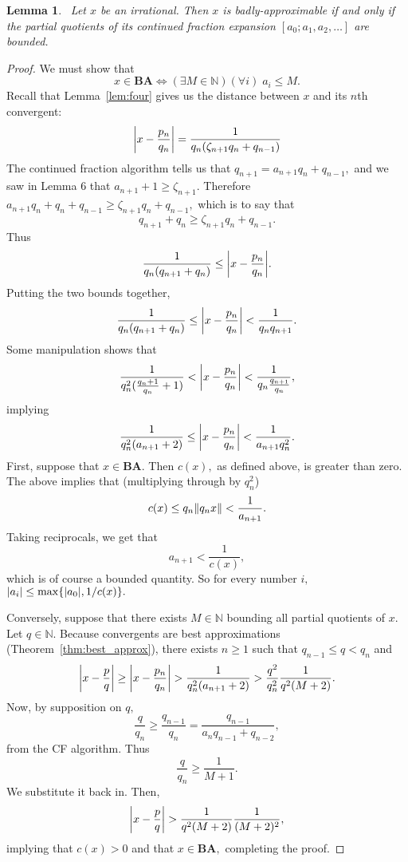 \documentclass[12pt, letterpaper, oneside]{book}
\newcommand{\gz}{\ensuremath{\zeta}}
\newcommand{\N}{\mathbb{N}}
\DeclarePairedDelimiter{\abs}{\lvert}{\rvert}
\DeclarePairedDelimiter{\norm}{\lVert}{\rVert}
\DeclarePairedDelimiter{\set}{\lbrace}{\rbrace}
\theoremstyle{plain}
\newtheorem{lemma}[theorem]{Lemma}
\theoremstyle{definition}
\theoremstyle{remark}
\begin{document}
\begin{lemma}~\label{lem: boundedcf}
Let $x$ be an irrational. Then $x$ is badly-approximable if and only if the partial quotients of its continued fraction expansion $[a_0; a_1, a_2, \ldots]$ are bounded.
\end{lemma}
\begin{proof}
We must show that
\[
x \in \mathbf{BA} \iff (\exists M \in \N) (\forall i) \; a_i \leq M.
\]
Recall that Lemma~\ref{lem:four} gives us the distance between $x$ and its $n$th convergent:
\[
\abs*{x - \frac{p_n}{q_n}} = \frac{1}{q_n(\gz_{n+1}q_n + q_{n-1})}
\]
The continued fraction algorithm tells us that $q_{n+1} = a_{n+1}q_n + q_{n-1},$ and we saw in Lemma 6 that $a_{n+1} + 1 \geq \gz_{n+1}.$ Therefore $a_{n+1}q_n + q_n + q_{n-1} \geq \gz_{n+1}q_n + q_{n-1},$ which is to say that
\[
q_{n+1} + q_n \geq \gz_{n+1}q_n + q_{n-1}.
\]
Thus
\[
\frac{1}{q_n(q_{n+1} + q_n)} \leq \abs*{x - \frac{p_n}{q_n}}. 
\]
Putting the two bounds together, 
\[
\frac{1}{q_n(q_{n+1} + q_n)} \leq \abs*{x - \frac{p_n}{q_n}} < \frac{1}{q_nq_{n+1}}.
\]
Some manipulation shows that
\[
\frac{1}{q_n^2(\frac{q_n+1}{q_n}+1)} < \abs*{x - \frac{p_n}{q_n}} < \frac{1}{q_n\frac{q_{n+1}}{q_n}},
\]
implying
\[
\frac{1}{q_n^2(a_{n+1} + 2)} \leq \abs*{x - \frac{p_n}{q_n}} < \frac{1}{a_{n+1}q_n^2}.
\]
First, suppose that $x \in \mathbf{BA}.$ Then $c(x),$ as defined above, is greater than zero. The above implies that (multiplying through by $q_n^2$)
\[
c(x) \leq q_n\norm{q_nx} < \frac{1}{a_{n+1}}.
\]
Taking reciprocals, we get that
\[
a_{n+1} < \frac{1}{c(x)},
\]
which is of course a bounded quantity. So for every number $i,$ $\abs{a_i} \leq \max\set{\abs{a_0},1/c(x)}.$

Conversely, suppose that there exists $M \in \N$ bounding all partial quotients of $x$. Let $q \in \N.$ Because convergents are best approximations (Theorem~\ref{thm:best_approx}), there exists $n \geq 1$ such that $q_{n-1} \leq q < q_n$ and
\[
\abs*{x - \frac{p}{q}} \geq \abs*{x - \frac{p_n}{q_n}} > \frac{1}{q_n^2(a_{n+1} + 2)} > \frac{q^2}{q_n^2}\frac{1}{q^2(M + 2)}.
\]
Now, by supposition on $q,$ 
\[
\frac{q}{q_n} \geq \frac{q_{n-1}}{q_n} = \frac{q_{n-1}}{a_nq_{n-1} + q_{n-2}},
\]
from the CF algorithm. Thus
\[
\frac{q}{q_n} \geq \frac{1}{M+1}.
\]
We substitute it back in. Then,
\[
\abs*{x - \frac{p}{q}} > \frac{1}{q^2(M + 2)} \frac{1}{(M+2)^2},
\]
implying that $c(x) > 0$ and that $x \in \mathbf{BA},$ completing the proof.
\end{proof}
\end{document}
